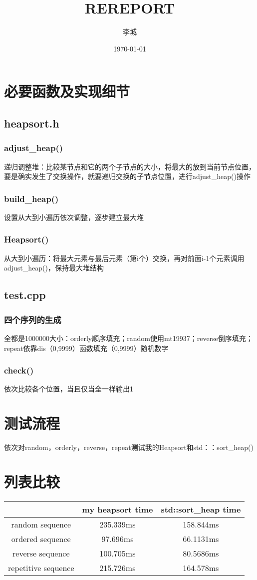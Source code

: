 \documentclass{article}
\title{REREPORT}
\author{李城}
\date{\today}
\begin{document}
\maketitle

\section{必要函数及实现细节}
\subsection{heapsort.h}
\subsubsection{adjust\_heap()}
递归调整堆：比较某节点和它的两个子节点的大小，将最大的放到当前节点位置，要是确实发生了交换操作，就要递归交换的子节点位置，进行adjust\_heap()操作
\subsubsection{build\_heap()}
设置从大到小遍历依次调整，逐步建立最大堆
\subsubsection{Heapsort()}
从大到小遍历：将最大元素与最后元素（第i个）交换，再对前面i-1个元素调用adjust\_heap()，保持最大堆结构
\subsection{test.cpp}
\subsubsection{四个序列的生成}
全都是1000000大小：orderly顺序填充；random使用mt19937；reverse倒序填充；repeat依靠dis（0,9999）函数填充（0,9999）随机数字
\subsubsection{check()}
依次比较各个位置，当且仅当全一样输出1
\section{测试流程}
依次对random，orderly，reverse，repeat测试我的Heapsort和std：：sort\_heap()
\section{列表比较}
\begin{tabular}{|c|c|c|}
\hline
 & my heapsort time & std::sort\_heap time \\
\hline
random sequence & 235.339ms & 158.844ms \\
\hline
ordered sequence & 97.696ms & 66.1131ms \\
\hline
reverse sequence & 100.705ms & 80.5686ms \\
\hline
repetitive sequence & 215.726ms & 164.578ms \\
\hline
\end{tabular}
\end{document}
